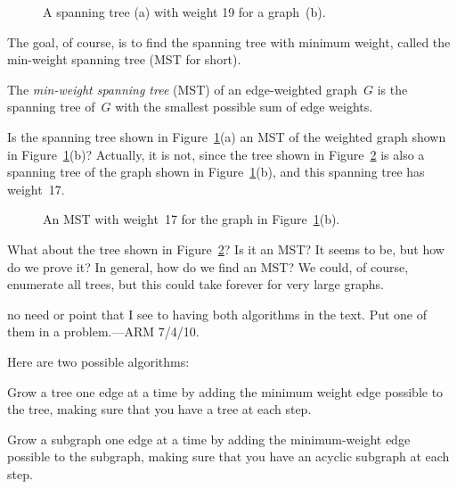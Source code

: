 \begin{figure}

%
\qquad
%

\caption{A spanning tree (a) with weight 19 for a graph~(b).}

\label{fig:5KA}

\end{figure}

The goal, of course, is to find the spanning tree with minimum weight,
called the min-weight spanning tree (MST for short).

\begin{definition}
The \emph{min-weight spanning tree} \textup(MST\textup) of an
edge-weighted graph~$G$ is the spanning tree of~$G$ with the smallest
possible sum of edge weights.
\end{definition}

Is the spanning tree shown in Figure~\ref{fig:5KA}(a) an MST of the
weighted graph shown in Figure~\ref{fig:5KA}(b)?  Actually, it is not,
since the tree shown in Figure~\ref{fig:5KB} is also a spanning tree
of the graph shown in Figure~\ref{fig:5KA}(b), and this spanning tree
has weight~17.

\begin{figure}


\caption{An MST with weight~17 for the graph in
  Figure~\ref{fig:5KA}(b).}
\label{fig:5KB}

\end{figure}

What about the tree shown in Figure~\ref{fig:5KB}?  Is it an MST?  It
seems to be, but how do we prove it?  In general, how do we find an
MST\@?  We could, of course, enumerate all trees, but this could take
forever for very large graphs.

\begin{staffnotes}no need or point that I see to having both
  algorithms in the text.  Put one of them in a problem.---ARM 7/4/10.
\end{staffnotes}
Here are two possible algorithms:

\begin{algorithm}\label{alg:MST1}
  Grow a tree one edge at a time by adding the minimum weight edge
  possible to the tree, making sure that you have a tree at each
  step.
\end{algorithm}

\begin{algorithm}\label{alg:MST2}
Grow a subgraph one edge at a time by adding the minimum-weight edge
possible to the subgraph, making sure that you have an acyclic
subgraph at each step.
\end{algorithm}

